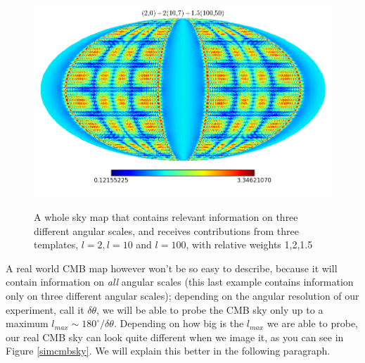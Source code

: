 \documentclass[11pt, a4paper,oneside,openright]{book}
\numberwithin{equation}{section}
\begin{document}
\begin{figure}
\begin{center}
\includegraphics[scale=0.6]{Fourier/superp.png}
\label{}
\end{center}
\caption{A whole sky map that contains relevant information on three different angular scales, and receives contributions from three templates, $l=2,l=10$ and $l=100$, with relative weights 1,2,1.5}
\label{superp}
\end{figure}
A real world CMB map however won't be so easy to describe, because it will contain information on \textit{all} angular scales (this last example contains information only on three different angular scales); depending on the angular resolution of our experiment, call it $\delta \theta$, we will be able to probe the CMB sky only up to a maximum $l_{max}\sim 180^\circ/\delta \theta$. Depending on how big is the $l_{max}$ we are able to probe, our real CMB sky can look quite different when we image it, as you can see in Figure \ref{simcmbsky}. We will explain this better in the following paragraph. 
\end{document}
